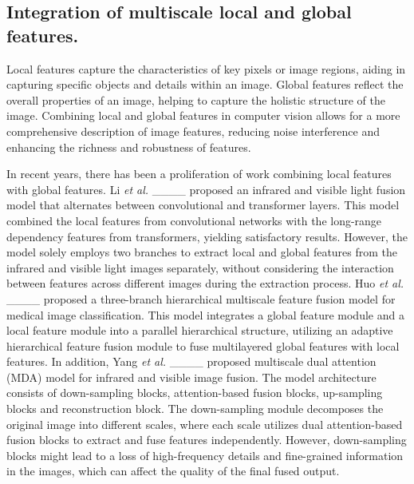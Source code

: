 \subsection{Integration of multiscale local and global features.}
Local features capture the characteristics of key pixels or image regions, aiding in capturing specific objects and details within an image. Global features reflect the overall properties of an image, helping to capture the holistic structure of the image. Combining local and global features in computer vision allows for a more comprehensive description of image features, reducing noise interference and enhancing the richness and robustness of features.

In recent years, there has been a proliferation of work combining local features with global features.
Li \textit{et al.} ____ proposed an infrared and visible light fusion model that alternates between convolutional and transformer layers.
This model combined the local features from convolutional networks with the long-range dependency features from transformers, yielding satisfactory results.
However, the model solely employs two branches to extract local and global features from the infrared and visible light images separately, without considering the interaction between features across different images during the extraction process.
Huo \textit{et al.} ____ proposed a three-branch hierarchical multiscale feature fusion model for medical image classification.
This model integrates a global feature module and a local feature module into a parallel hierarchical structure, utilizing an adaptive hierarchical feature fusion module to fuse multilayered global features with local features.
In addition, Yang \textit{et al.} ____ proposed multiscale dual attention (MDA) model for infrared and visible image fusion.
The model architecture consists of down-sampling blocks, attention-based fusion blocks, up-sampling blocks and reconstruction block.
The down-sampling module decomposes the original image into different scales, where each scale utilizes dual attention-based fusion blocks to extract and fuse features independently.
However, down-sampling blocks might lead to a loss of high-frequency details and fine-grained information in the images, which can affect the quality of the final fused output.